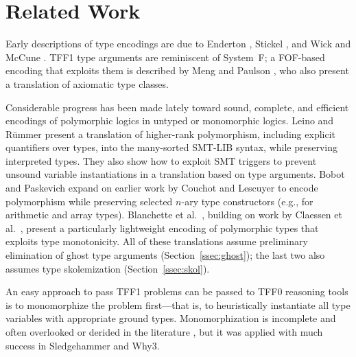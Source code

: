 \section{Related Work}
\label{sec_related_work}





Early descriptions of type encodings are due to Enderton
\cite[\S4.3]{enderton-1972}, Stickel \cite[p.~99]{stickel-1986}, and Wick and
McCune \cite[\S4]{wick-mccune-1989}. TFF1 type arguments are reminiscent of
System~F; a FOF-based encoding that exploits them is described by Meng and
Paulson \cite{meng-paulson-2008-trans}, who also present a translation of
axiomatic type classes.

Considerable progress has been made lately toward sound, complete, and efficient
encodings of polymorphic logics in untyped or monomorphic logics. Leino and
R\"ummer \cite{leino-ruemmer-2010} present a translation of higher-rank
polymorphism, including explicit quantifiers over types, into the many-sorted
SMT-LIB syntax, while preserving interpreted types. They also show how to
exploit SMT triggers to prevent unsound variable instantiations in a
translation based on type arguments. Bobot and Paskevich
\cite{bobot-paskevich-2011} expand on earlier work by Couchot and Lescuyer
\cite{couchot-lescuyer-2007} to encode polymorphism while preserving selected
$n$-ary type constructors (e.g., for arithmetic and array types).
Blanchette et
al.\ \cite{blanchette-et-al-2012-mono}, building on work by Claessen et al.\
\cite{claessen-et-al-2011}, present a particularly lightweight encoding of
polymorphic types that exploits type monotonicity. All of these translations
assume preliminary elimination of ghost type arguments
(Section~\ref{ssec:ghost}); the last two also assumes type skolemization
(Section~\ref{ssec:skol}).

An easy approach to pass TFF1 problems can be passed to TFF0
reasoning tools is to monomorphize the problem first---that is, to heuristically
instantiate all type variables with appropriate
ground types. Monomorphization is incomplete and often overlooked
or derided in the literature \cite[p.\ 3]{couchot-lescuyer-2007}, but it was
applied with much success in Sledgehammer \cite[\S6]{blanchette-et-al-2012-mono}
and Why3.
